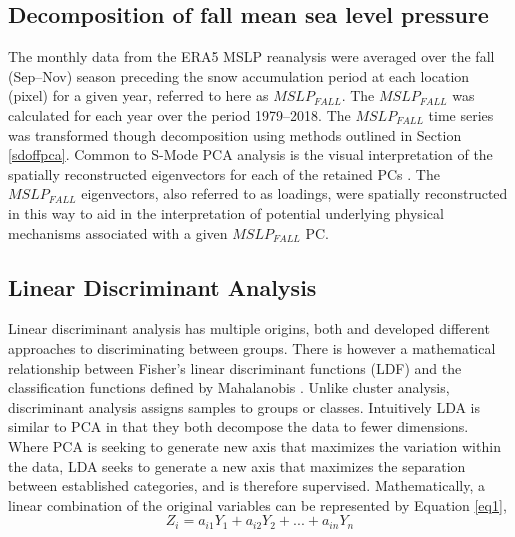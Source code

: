 \documentclass{tATO2e}
\begin{document}
\subsection{Decomposition of fall mean sea level pressure}\label{sec:3.b}
The monthly data from the ERA5 MSLP reanalysis were averaged over the fall (Sep--Nov) season preceding the snow accumulation period at each location (pixel) for a given year, referred to here as $MSLP_{FALL}$. The $MSLP_{FALL}$ was calculated for each year over the period 1979--2018. The $MSLP_{FALL}$ time series was transformed though decomposition using methods outlined in Section \ref{sdoffpca}. Common to S-Mode PCA analysis is the visual interpretation of the spatially reconstructed  eigenvectors for each of the retained PCs \citep{Urska2013}. The $MSLP_{FALL}$ eigenvectors, also referred to as loadings, were spatially reconstructed in this way to aid in the interpretation of potential underlying physical mechanisms associated with a given $MSLP_{FALL}$ PC. 

\subsection{Linear Discriminant Analysis}
Linear discriminant analysis has multiple origins, both \cite{Fisher1936} and \cite{Mahalanobis1936} developed different approaches to discriminating between groups. There is however a mathematical relationship between Fisher’s linear discriminant functions (LDF) and the classification functions defined by Mahalanobis \citep[e.g.,][]{Kshirsagar1975}. Unlike cluster analysis, discriminant analysis assigns samples to groups or classes. Intuitively LDA is similar to PCA in that they both decompose the data to fewer dimensions. Where PCA is seeking to generate new axis that maximizes the variation within the data, LDA seeks to generate a new axis that maximizes the separation between established categories, and is therefore supervised. Mathematically, a linear combination of the original variables can be represented by Equation \ref{eq1},
\begin{equation}
	Z_{i} = a_{i1}Y_{1} + a_{i2}Y_{2} + ... + a_{in}Y_{n}
	\label{eq1}
\end{equation}
\end{document}
